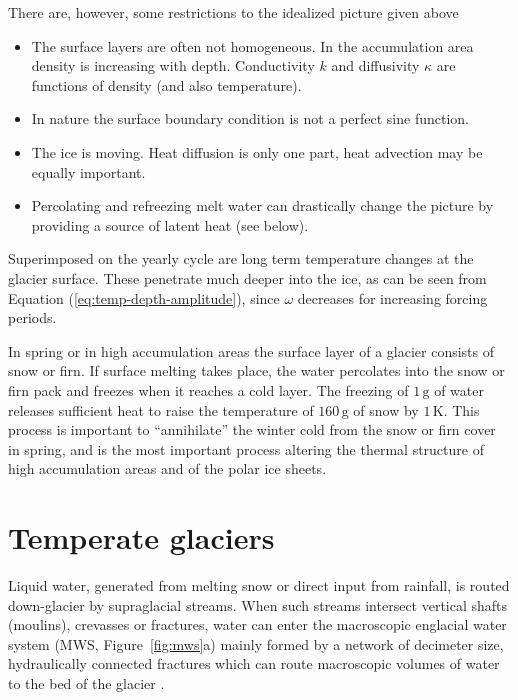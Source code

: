 \documentclass[parskip=half]{scrartcl}
\newcommand{\unit}[1]{\ensuremath{\,\mathrm{#1}}}
\begin{document}
There are, however, some restrictions to the idealized picture given above
%
\begin{itemize}
\item The surface layers are often not homogeneous.  In the accumulation area
 density is increasing with depth. Conductivity $k$ and diffusivity $\kappa$
 are functions of density (and also temperature).
\item In nature the surface boundary condition is not a perfect sine function.
\item The ice is moving.  Heat diffusion is only one part, heat advection may
 be equally important.
\item Percolating and refreezing melt water can drastically change the picture
 by providing a source of latent heat (see below).
\end{itemize}
%
Superimposed on the yearly cycle are long term temperature changes at the
glacier surface.  These penetrate much deeper into the ice, as can be seen
from Equation (\ref{eq:temp-depth-amplitude}), since $\omega$ decreases for
increasing forcing periods.

In spring or in high accumulation areas the surface layer of a glacier
consists of snow or firn.  If surface melting takes place, the water
percolates into the snow or firn pack and freezes when it reaches a cold
layer.  The freezing of $1\unit{g}$ of water releases sufficient heat to raise
the temperature of $160\unit{g}$ of snow by $1\unit{K}$.  This process is
important to ``annihilate'' the winter cold from the snow or firn cover in
spring, and is the most important process altering the thermal structure of
high accumulation areas and of the polar ice sheets.


\section{Temperate glaciers}
\label{sec:temperate-glaciers}

Liquid water, generated from melting snow or direct input from rainfall, is routed down{-}glacier by supraglacial streams. When such streams intersect vertical shafts (moulins), crevasses or fractures, water can enter the macroscopic englacial water system (MWS, Figure~\ref{fig:mws}a) mainly formed by a network of decimeter size, hydraulically connected fractures which can route macroscopic volumes of water to the bed of the glacier \citep{FountainWalder1998,Fountain2005}.
%
\end{document}
